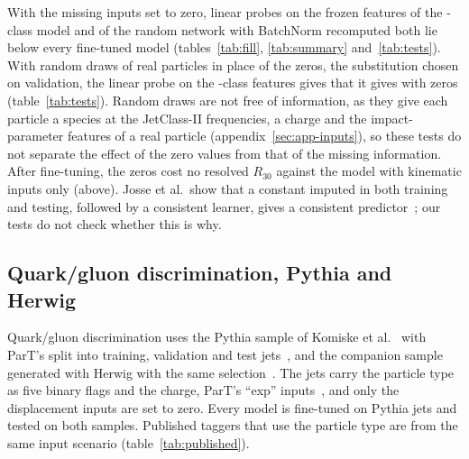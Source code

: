 With the missing inputs set to zero, linear probes on the frozen features of the \Kfull-class model and of the
random network with BatchNorm recomputed both lie below every fine-tuned model (tables~\ref{tab:fill},
\ref{tab:summary} and~\ref{tab:tests}). With random draws of real particles in place of
the zeros, the substitution chosen on validation, the linear probe on the \Kfull-class features gives
\MlstLpTopRthirtyDrawOverZeroFullPr{} that it gives with zeros (table~\ref{tab:tests}). Random
draws are not free of information, as they give each particle a species at the JetClass-II frequencies, a charge
and the impact-parameter features of a real particle (appendix~\ref{sec:app-inputs}), so these tests do not separate the effect of the zero values from that
of the missing information. After fine-tuning, the zeros cost no resolved $R_{30}$ against the model with kinematic
inputs only (above). Josse et al.\ show that a constant imputed in both training and testing, followed by a
consistent learner, gives a consistent predictor~\cite[Theorem~3]{josse}; our tests do not check whether this is
why. %

\subsection{Quark/gluon discrimination, Pythia and Herwig}\label{sec:qg}

Quark/gluon discrimination uses the Pythia sample of Komiske et al.~\cite{efn,qgpythia} with ParT's
split into training, validation and test jets~\cite{part}, and the companion sample generated with
Herwig with the same selection~\cite{herwigsevenone,qgherwig}. The jets carry the particle type as five binary
flags and the charge, ParT's ``exp'' inputs~\cite{part}, and only the \FillQgNZero{} displacement inputs are set
to zero. Every model is fine-tuned on Pythia jets and tested on both samples. Published taggers that use the
particle type are from the same input scenario (table~\ref{tab:published}).

